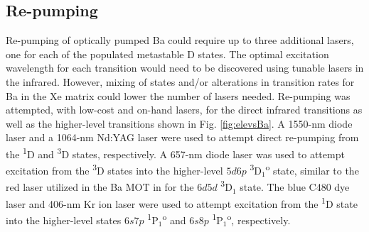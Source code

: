 
\subsection{Re-pumping}


Re-pumping of optically pumped Ba could require up to three additional lasers, one for each of the populated metastable D states.  The optimal excitation wavelength for each transition would need to be discovered using tunable lasers in the infrared.  However, mixing of states and/or alterations in transition rates for Ba in the Xe matrix could lower the number of lasers needed.  Re-pumping was attempted, with low-cost and on-hand lasers, for the direct infrared transitions as well as the higher-level transitions shown in Fig. \ref{fig:elevsBa}.  A 1550-nm diode laser and a 1064-nm Nd:YAG laser were used to attempt direct re-pumping from the \textsuperscript{1}D and \textsuperscript{3}D states, respectively.  A 657-nm diode laser was used to attempt excitation from the \textsuperscript{3}D states into the higher-level $5d6p$ \textsuperscript{3}D$_{1}$\textsuperscript{o} state, similar to the red laser utilized in the Ba MOT in \cite{BaMOT} for the $6d5d$ \textsuperscript{3}D$_{1}$ state.  The blue C480 dye laser and 406-nm Kr ion laser were used to attempt excitation from the \textsuperscript{1}D state into the higher-level states $6s7p$ \textsuperscript{1}P$_{1}$\textsuperscript{o} and $6s8p$ \textsuperscript{1}P$_{1}$\textsuperscript{o}, respectively.


